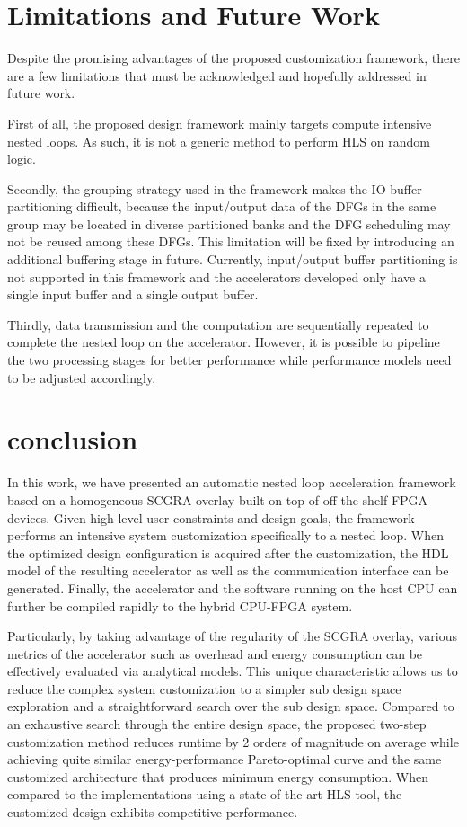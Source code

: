 \section{Limitations and Future Work} \label{sec:limitations}
Despite the promising advantages of the proposed customization framework, there 
are a few limitations that must be acknowledged and hopefully addressed 
in future work.

First of all, the proposed design framework mainly targets compute intensive 
nested loops. As such, it is not a generic method to perform HLS on random logic.

Secondly, the grouping strategy used in the framework makes the IO buffer partitioning 
difficult, because the input/output data of the DFGs in the same group may be located in
diverse partitioned banks and the DFG scheduling may not be reused among these DFGs. 
This limitation will be fixed by introducing an additional buffering stage in future.
Currently, input/output buffer partitioning is not supported in this framework and the 
accelerators developed only have a single input buffer and a single output buffer. 

Thirdly, data transmission and the computation are sequentially repeated to complete 
the nested loop on the accelerator. However, it is possible to pipeline the two 
processing stages for better performance while performance models need to be 
adjusted accordingly.

\section{conclusion} \label{sec:conclusion}
In this work, we have presented an automatic nested loop acceleration 
framework based on a homogeneous SCGRA overlay built on top of 
off-the-shelf FPGA devices. Given high level user constraints and design goals, 
the framework performs an intensive system customization specifically 
to a nested loop. When the optimized design configuration is 
acquired after the customization, the HDL model of the resulting accelerator  
as well as the communication interface can be generated. Finally, the accelerator 
and the software running on the host CPU can further be compiled rapidly to 
the hybrid CPU-FPGA system.

Particularly, by taking advantage of the regularity of 
the SCGRA overlay, various metrics of the accelerator such as overhead 
and energy consumption can be effectively evaluated via analytical models. 
This unique characteristic allows us to reduce the complex system 
customization to a simpler sub design space exploration and a 
straightforward search over the sub design space. Compared to an 
exhaustive search through the entire design space, the proposed 
two-step customization method reduces runtime by 2 orders of magnitude 
on average while achieving quite similar energy-performance Pareto-optimal 
curve and the same customized architecture that produces 
minimum energy consumption. When compared to the implementations using 
a state-of-the-art HLS tool, the customized design exhibits competitive 
performance. 


